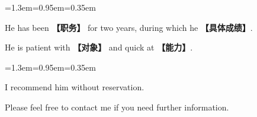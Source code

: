 \documentclass[10pt,a4paper]{ctexart}
\begin{document}
\par\vspace{1pt}
\begin{list}{}{\leftmargin=1.3em=0.95em=0.35em\itemindent=0pt\topsep=0pt\partopsep=0pt\parsep=1.5pt\itemsep=0pt}
\item[{\color{accent}\scriptsize$\blacktriangleright$}]{\footnotesize He has been {\color{accent}\bfseries 【职务】} for two years, during which he {\color{accent}\bfseries 【具体成绩】}.}\par{}
\item[{\color{accent}\scriptsize$\blacktriangleright$}]{\footnotesize He is patient with {\color{accent}\bfseries 【对象】} and quick at {\color{accent}\bfseries 【能力】}.}\par{}
\end{list}
\par\vspace{1pt}
\begin{list}{}{\leftmargin=1.3em=0.95em=0.35em\itemindent=0pt\topsep=0pt\partopsep=0pt\parsep=1.5pt\itemsep=0pt}
\item[{\color{accent}\scriptsize$\blacktriangleright$}]{\footnotesize I recommend him without reservation.}\par{}
\item[{\color{accent}\scriptsize$\blacktriangleright$}]{\footnotesize Please feel free to contact me if you need further information.}\par{}
\end{list}
\par
\endgroup
\vspace{4pt}\par\nopagebreak
\end{document}
